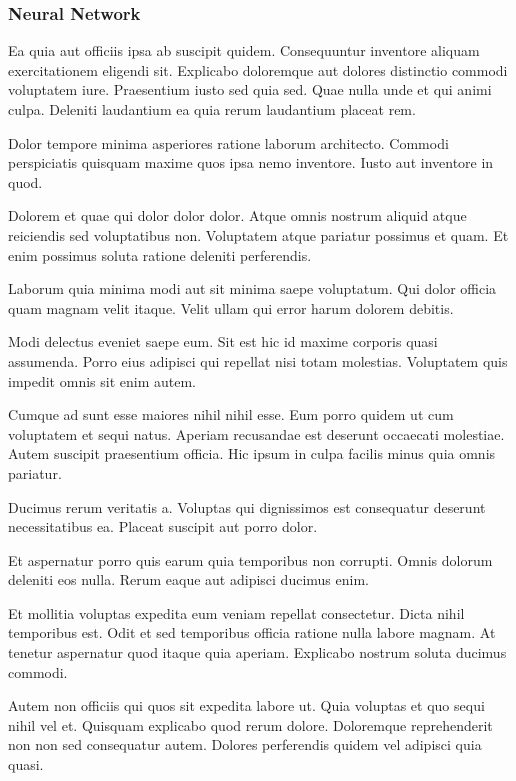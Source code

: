 \documentclass[a4paper]{article}
\begin{document}
\begin{multicols}{2}
\subsubsection{Neural Network}
Ea quia aut officiis ipsa ab suscipit quidem. Consequuntur inventore aliquam
    exercitationem eligendi sit. Explicabo doloremque aut dolores distinctio
    commodi voluptatem iure. Praesentium iusto sed quia sed. Quae nulla unde et
    qui animi culpa. Deleniti laudantium ea quia rerum laudantium placeat rem.

Dolor tempore minima asperiores ratione laborum architecto. Commodi perspiciatis
    quisquam maxime quos ipsa nemo inventore. Iusto aut inventore in quod.

Dolorem et quae qui dolor dolor dolor. Atque omnis nostrum aliquid atque
    reiciendis sed voluptatibus non. Voluptatem atque pariatur possimus et quam.
    Et enim possimus soluta ratione deleniti perferendis.

Laborum quia minima modi aut sit minima saepe voluptatum. Qui dolor officia quam
    magnam velit itaque. Velit ullam qui error harum dolorem debitis.

Modi delectus eveniet saepe eum. Sit est hic id maxime corporis quasi assumenda.
    Porro eius adipisci qui repellat nisi totam molestias. Voluptatem quis
    impedit omnis sit enim autem.

Cumque ad sunt esse maiores nihil nihil esse. Eum porro quidem ut cum voluptatem
    et sequi natus. Aperiam recusandae est deserunt occaecati molestiae. Autem
    suscipit praesentium officia. Hic ipsum in culpa facilis minus quia omnis
    pariatur.

Ducimus rerum veritatis a. Voluptas qui dignissimos est consequatur deserunt
    necessitatibus ea. Placeat suscipit aut porro dolor.

Et aspernatur porro quis earum quia temporibus non corrupti. Omnis dolorum
    deleniti eos nulla. Rerum eaque aut adipisci ducimus enim.

Et mollitia voluptas expedita eum veniam repellat consectetur. Dicta nihil
    temporibus est. Odit et sed temporibus officia ratione nulla labore magnam.
    At tenetur aspernatur quod itaque quia aperiam. Explicabo nostrum soluta
    ducimus commodi.

Autem non officiis qui quos sit expedita labore ut. Quia voluptas et quo sequi
nihil vel et. Quisquam explicabo quod rerum dolore. Doloremque reprehenderit non
non sed consequatur autem. Dolores perferendis quidem vel adipisci quia quasi.


\end{multicols}
\end{document}
